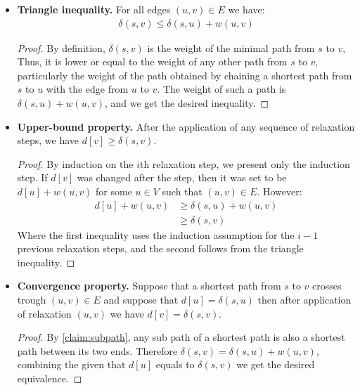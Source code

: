   \begin{itemize}
    \item \textbf{Triangle inequality.}
        For all edges $(u,v) \in E$ we have: \begin{equation*}
          \begin{split}
            \delta(s,v) \le \delta(s,u) + w(u,v)
          \end{split}
        \end{equation*}
        \begin{proof}
          By definition, $\delta(s,v)$ is the weight of the minimal path from $s$ to $v$, Thus, it is lower or equal to the weight of any other path from $s$ to $v$, particularly the weight of the path obtained by chaining a shortest path from $s$ to $u$ with the edge from $u$ to $v$. The weight of such a path is $\delta(s,u) + w(u,v)$, and we get the desired inequality.
        \end{proof}

      \item \textbf{Upper-bound property.} 
        After the application of any sequence of relaxation steps, we have $d[v] \ge \delta(s,v)$.
          \begin{proof}
           By induction on the $i$th relaxation step, we present only the induction step. If $d[v]$ was changed after the step, then it was set to be $d[u] + w(u,v)$ for some $u \in V$ such that $(u,v) \in E$. However:
            \begin{equation*}
              \begin{split}
                d[u] + w(u,v) & \ge \delta(s,u) + w(u,v) \\ 
                & \ge \delta(s,v)
              \end{split}
            \end{equation*}
Where the first inequality uses the induction assumption for the $i-1$ previous relaxation steps, and the second follows from the triangle inequality.
          \end{proof}

        \item \textbf{Convergence property.} Suppose that a shortest path from $s$ to $v$ crosses trough $(u,v) \in E$ and suppose that $d[u] = \delta(s,u)$ then after application of relaxation $(u,v)$ we have $d[v] = \delta(s,v)$. 
          \begin{proof}
            By \cref{claim:subpath}, any sub path of a shortest path is also a shortest path between its two ends. Therefore $\delta(s,v) = \delta(s,u) + w(u,v)$, combining the given that $d[u]$ equals to $\delta(s,v)$ we get the desired equivalence. 
          \end{proof}


\end{itemize}
